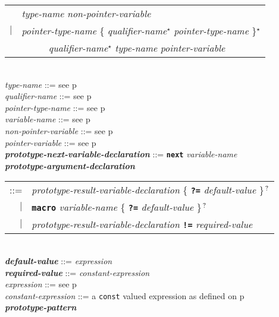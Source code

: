 \documentclass[12pt]{article}
\newcommand{\TT}[1]{{\tt \bfseries #1}}
\newcommand{\STAR}{{\Large $^\star$}}
\newcommand{\QMARK}{{$^{\,\mbox{\footnotesize ?}}$}}
\newcommand{\ttkey}[1]{{\tt \bfseries #1}}
\newcommand{\emkey}[1]{{\em \bfseries #1}}
\newcommand{\pagref}[1]{p\pageref{#1}}
\newenvironment{indpar}[1][0.3in]%
	{\begin{list}{}%
		     {\setlength{\itemsep}{0in}%
		      \setlength{\topsep}{0in}%
		      \setlength{\parsep}{1ex}%
		      \setlength{\labelwidth}{#1}%
		      \setlength{\leftmargin}{#1}%
		      \addtolength{\leftmargin}{\labelsep}}%
	 \item}%
	{\end{list}}
\begin{document}
\begin{indpar}[0.1in]
\hspace*{0.5in}\begin{tabular}{rl}
	    & {\em type-name} {\em non-pointer-variable} \\
	$|$ & {\em pointer-type-name}
              \{ {\em qualifier-name}\STAR{} {\em pointer-type-name}
	      \}\STAR{} \\
	& ~~~~~ {\em qualifier-name}\STAR{}
	        {\em type-name} {\em pointer-variable}
	\end{tabular}
\\[0.5ex]
{\em type-name} ::= see \pagref{TYPE-NAME}
\\[0.5ex]
{\em qualifier-name} ::= see \pagref{QUALIFIER-NAME}
\\[0.5ex]
{\em pointer-type-name} ::= see \pagref{POINTER-TYPE-NAME}
\\[0.5ex]
{\em variable-name} ::= see \pagref{VARIABLE-NAME}
\\[0.5ex]
{\em non-pointer-variable} ::= see \pagref{NON-POINTER-VARIABLE}
\\[0.5ex]
{\em pointer-variable} ::= see \pagref{POINTER-VARIABLE}
\\[0.5ex]
\emkey{prototype-next-variable-declaration}%
    \label{PROTOTYPE-NEXT-VARIABLE-DECLARATION}
      ::= \ttkey{next} {\em variable-name}
\\[0.5ex]
\emkey{prototype-argument-declaration}\label{PROTOTYPE-ARGUMENT-DECLARATION} \\
\hspace*{0.5in}\begin{tabular}[t]{@{}rl@{}}
    ::= & {\em prototype-result-variable-declaration}
          \{ \TT{?=} {\em default-value} \}\QMARK{} \\
    $|$ & \TT{macro} {\em variable-name}
          \{ \TT{?=} {\em default-value} \}\QMARK{} \\
    $|$ & {\em prototype-result-variable-declaration}
          \TT{!=} {\em required-value} \\
    \end{tabular}
\\[0.5ex]
\emkey{default-value} ::= {\em expression}
\\[0.5ex]
\emkey{required-value} ::= {\em constant-expression}
\\[0.5ex]
{\em expression} ::= see \pagref{EXPRESSION}
\\[0.5ex]
{\em constant-expression} ::= a {\tt const} valued expression as
    defined on \pagref{CONSTANT-EXPRESSION}
\\[0.5ex]
\emkey{prototype-pattern}\label{PROTOTYPE-PATTERN}

\end{indpar}
\end{document}
